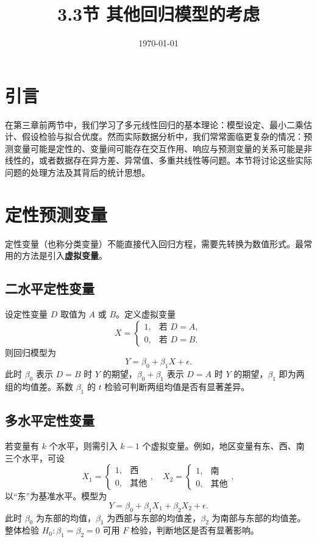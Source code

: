 \documentclass[UTF8]{ctexart}
\title{3.3节 其他回归模型的考虑}
\date{\today}
\numberwithin{equation}{section}
\begin{document}
\maketitle

\section*{引言}
在第三章前两节中，我们学习了多元线性回归的基本理论：模型设定、最小二乘估计、假设检验与拟合优度。然而实际数据分析中，我们常常面临更复杂的情况：预测变量可能是定性的、变量间可能存在交互作用、响应与预测变量的关系可能是非线性的，或者数据存在异方差、异常值、多重共线性等问题。本节将讨论这些实际问题的处理方法及其背后的统计思想。

\section{定性预测变量}
\label{sec:qualitative}

定性变量（也称分类变量）不能直接代入回归方程，需要先转换为数值形式。最常用的方法是引入\textbf{虚拟变量}。

\subsection{二水平定性变量}
设定性变量 \(D\) 取值为 \(A\) 或 \(B\)。定义虚拟变量
\[
X = \begin{cases}
1, & \text{若 } D = A,\\
0, & \text{若 } D = B.
\end{cases}
\]
则回归模型为
\[
Y = \beta_0 + \beta_1 X + \epsilon.
\]
此时 \(\beta_0\) 表示 \(D=B\) 时 \(Y\) 的期望，\(\beta_0+\beta_1\) 表示 \(D=A\) 时 \(Y\) 的期望，\(\beta_1\) 即为两组的均值差。系数 \(\beta_1\) 的 \(t\) 检验可判断两组均值是否有显著差异。

\subsection{多水平定性变量}
若变量有 \(k\) 个水平，则需引入 \(k-1\) 个虚拟变量。例如，地区变量有东、西、南三个水平，可设
\[
X_1 = \begin{cases}1, & \text{西}\\0, & \text{其他}\end{cases},\quad
X_2 = \begin{cases}1, & \text{南}\\0, & \text{其他}\end{cases},
\]
以“东”为基准水平。模型为
\[
Y = \beta_0 + \beta_1 X_1 + \beta_2 X_2 + \epsilon.
\]
此时 \(\beta_0\) 为东部的均值，\(\beta_1\) 为西部与东部的均值差，\(\beta_2\) 为南部与东部的均值差。整体检验 \(H_0:\beta_1=\beta_2=0\) 可用 \(F\) 检验，判断地区是否有显著影响。
\end{document}
